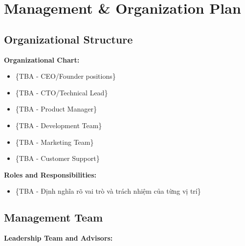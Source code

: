 \section{Management \& Organization Plan}

\subsection{Organizational Structure}
\textbf{Organizational Chart:}
\begin{itemize}
    \item \{TBA - CEO/Founder positions\}
    \item \{TBA - CTO/Technical Lead\}
    \item \{TBA - Product Manager\}
    \item \{TBA - Development Team\}
    \item \{TBA - Marketing Team\}
    \item \{TBA - Customer Support\}
\end{itemize}

\textbf{Roles and Responsibilities:}
\begin{itemize}
    \item \{TBA - Định nghĩa rõ vai trò và trách nhiệm của từng vị trí\}
\end{itemize}

\subsection{Management Team}
\textbf{Leadership Team and Advisors:}

